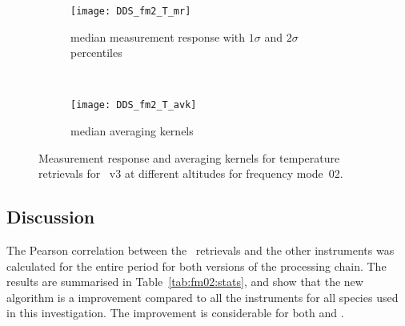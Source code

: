 \begin{figure}[tbhp]
    \centering
    \begin{subfigure}[b]{0.49\textwidth}
        \texttt{[image: DDS\_fm2\_T\_mr]}
        \caption{median measurement response with $1\sigma$ and $2\sigma$
        percentiles}
        \label{fig:fm02:T:mr}
    \end{subfigure}
    \,
    \begin{subfigure}[b]{0.49\textwidth}
        \texttt{[image: DDS\_fm2\_T\_avk]}
        \caption{median averaging kernels\newline~}
        \label{fig:fm02:T:avk}
    \end{subfigure}
    \caption{Measurement response and averaging kernels for temperature
    retrievals for \smr~v3 at different altitudes for frequency mode~02.}
    \label{fig:fm02:T:mr_avk}
\end{figure}


\subsection{Discussion}
\label{sec:fm02:discussion}
The Pearson correlation between the \smr\ retrievals and the other instruments
was calculated for the entire period for both versions of the processing chain.
The results are summarised in Table~\ref{tab:fm02:stats}, and show that the
new algorithm is a improvement compared to all the instruments for all species
used in this investigation. The improvement is considerable for both 
and .


